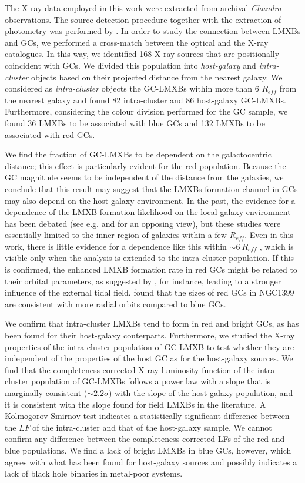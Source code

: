 \documentclass{aa}
\begin{document}
The X-ray data employed in this work were extracted from archival \textit{Chandra} observations. The source detection procedure together with the extraction of photometry  was performed by \cite{Jin2019}.
In order to study the connection between LMXBs and GCs, we performed a cross-match between the optical and the X-ray catalogues. In this way, we identified 168 X-ray sources that are positionally coincident with GCs. We divided this population into \textit{host-galaxy} and \textit{intra-cluster} objects based on their projected distance from the nearest galaxy. We considered as \textit{intra-cluster} objects the GC-LMXBs within more than 6 $R_{eff}$ from the nearest galaxy and found 82 intra-cluster and 86 host-galaxy GC-LMXBs. Furthermore, considering the colour division performed for the GC sample, we found 36 LMXBs to be associated with blue GCs and 132  LMXBs to be associated with red GCs. 

We find the fraction of GC-LMXBs to be dependent on the galactocentric distance; this effect is particularly evident for the red population. Because the GC magnitude seems to be independent of the distance from the galaxies, we conclude that this result may suggest that the LMXBs formation channel in GCs may also depend on the host-galaxy environment. In the past, the evidence for a dependence of the LMXB formation likelihood on the local galaxy environment has been debated (see e.g. \citealt{Kim2006} and \citealt{Paolillo2011} for an opposing view), but these studies were essentially limited to the inner region of galaxies within a few $R_{eff}$. Even in this work, there is little evidence for a dependence like this within $\sim 6~  R_{eff}$ , which is visible only when the analysis is extended to the intra-cluster population. If this is confirmed, the enhanced LMXB formation rate in red GCs might be related to their orbital parameters, as suggested by \cite{Puzia2014}, for instance, leading to a stronger influence of the external tidal field.  \cite{Webb2016} found that the sizes of red GCs in NGC1399 are consistent with more radial orbits compared to blue GCs.

We confirm that intra-cluster LMXBs tend to form in red and bright GCs, as has been found for their host-galaxy couterparts. Furthermore, we studied the X-ray properties of the intra-cluster population of GC-LMXB to test whether they are independent of the properties of the host GC as for the host-galaxy sources. We find that the completeness-corrected X-ray luminosity function of the intra-cluster population of GC-LMXBs follows a power law with a slope that is marginally consistent ($\sim 2.2\sigma$) with the slope of the host-galaxy population, and it is consistent with the slope found for field LMXBs in the literature. A Kolmogorov-Smirnov test indicates a statistically significant difference between the $LF$ of the intra-cluster and that of the host-galaxy sample. We cannot confirm any difference between the completeness-corrected LFs of the red and blue populations. We find a lack of bright LMXBs in blue GCs, however, which agrees with what has been found for host-galaxy sources and possibly indicates a lack of black hole binaries in metal-poor systems.
\end{document}

